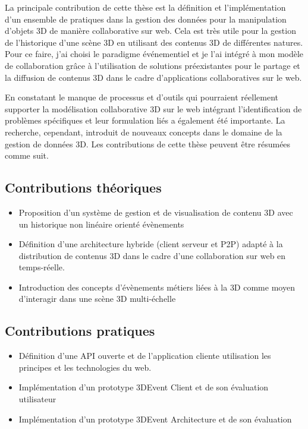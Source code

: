La principale contribution de cette thèse est la définition et l'implémentation d'un 
ensemble de pratiques dans la gestion des données pour la manipulation d'objets 
3D de manière collaborative sur web. Cela est très utile pour la gestion de 
l'historique d'une scène \gls{3D} en utilisant des contenus \gls{3D} de différentes 
natures. Pour ce faire, j'ai choisi le paradigme événementiel et je l'ai 
intégré à mon modèle de collaboration grâce à l'utilisation de solutions 
préexistantes pour le partage et la diffusion de contenus \gls{3D} dans le cadre 
d'applications collaboratives sur le web.

En constatant le manque de processus et d'outils qui pourraient réellement supporter la modélisation collaborative \gls{3D} sur le web intégrant l'identification de problèmes spécifiques et leur formulation liés a également été importante. 
La recherche, cependant, introduit de nouveaux concepts dans le domaine de la gestion de 
données \gls{3D}. Les contributions de cette thèse peuvent être résumées comme 
suit.


\subsection{Contributions théoriques}

\begin{itemize}
	\item {}Proposition d'un système de 
	gestion et de visualisation de contenu \gls{3D} avec un historique non linéaire 
	orienté évènements
	\item Définition d'une architecture hybride (client serveur et \gls{P2P}) adapté à 
	la distribution de contenus \gls{3D} dans le cadre d'une collaboration sur web en 
	temps-réelle.
	\item Introduction des concepts d'évènements métiers liées à la \gls{3D} 
	comme moyen d'interagir dans une scène  \gls{3D} multi-échelle
\end{itemize}
\subsection{Contributions pratiques}
\begin{itemize}
	\item {}Définition d'une API ouverte et 
	de l'application cliente utilisation les principes et les technologies du web.
	\item Implémentation d'un prototype 3DEvent Client et de son évaluation 
	utilisateur 
	\item Implémentation d'un prototype 3DEvent Architecture et de son évaluation
	
\end{itemize}

